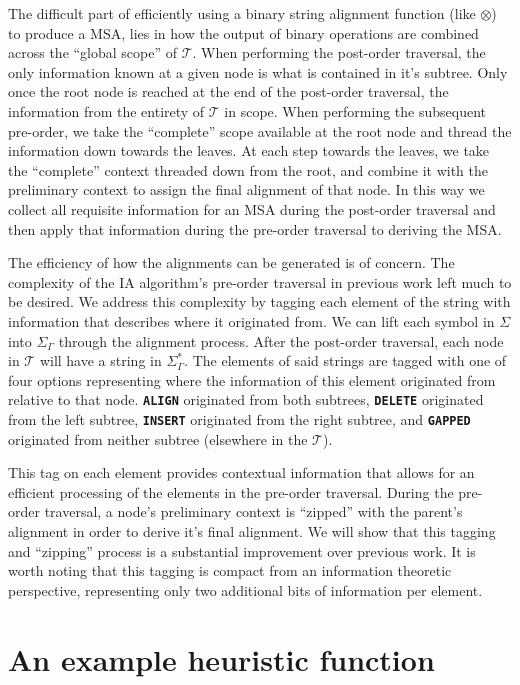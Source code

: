 \documentclass{bmcart}
\begin{document}
The difficult part of efficiently using a binary string alignment function (like $\otimes$) to produce a MSA, lies in how the output of binary operations are combined across the ``global scope'' of $\mathcal{T}$.
When performing the post-order traversal, the only information known at a given node is what is contained in it's subtree.
Only once the root node is reached at the end of the post-order traversal, the information from the entirety of $\mathcal{T}$ in scope.
When performing the subsequent pre-order, we take the ``complete'' scope available at the root node and thread the information down towards the leaves.
At each step towards the leaves, we take the ``complete'' context threaded down from the root, and combine it with the preliminary context to assign the final alignment of that node.
In this way we collect all requisite information for an MSA during the post-order traversal and then apply that information during the pre-order traversal to deriving the MSA.

The efficiency of how the alignments can be generated is of concern.
The complexity of the IA algorithm's pre-order traversal in previous work left much to be desired.
We address this complexity by tagging each element of the string with information that describes where it originated from. 
We can lift each symbol in $\Sigma$ into $\Sigma_{\Gamma}$ through the alignment process.
After the post-order traversal, each node in $\mathcal{T}$ will have a string in $\Sigma_{\Gamma}^{*}$.
The elements of said strings are tagged with one of four options representing where the information of this element originated from relative to that node.
\textbf{\texttt{ALIGN}} originated from both subtrees, \textbf{\texttt{DELETE}} originated from the left subtree, \textbf{\texttt{INSERT}} originated from the right subtree, and \textbf{\texttt{GAPPED}} originated from neither subtree (elsewhere in the $\mathcal{T}$).

This tag on each element provides contextual information that allows for an efficient processing of the elements in the pre-order traversal.
During the pre-order traversal, a node's preliminary context is ``zipped'' with the parent's alignment in order to derive it's final alignment.
We will show that this tagging and ``zipping'' process is a substantial improvement over previous work. 
It is worth noting that this tagging is compact from an information theoretic perspective, representing only two additional bits of information per element.


\section*{An example heuristic function}
\end{document}
